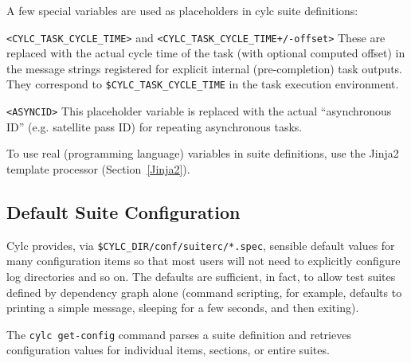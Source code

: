 A few special variables are used as placeholders in cylc suite definitions:

\begin{myitemize}
    \item \lstinline=<CYLC_TASK_CYCLE_TIME>= and
        \lstinline=<CYLC_TASK_CYCLE_TIME+/-offset>= \newline
        These are replaced with the actual cycle time of the task (with
        optional computed offset) in the message strings registered for
        explicit internal (pre-completion) task outputs. They correspond to 
        \lstinline=$CYLC_TASK_CYCLE_TIME= in the task execution environment.

    \item \lstinline=<ASYNCID>=\newline
        This placeholder variable is replaced with the actual ``asynchronous
        ID'' (e.g. satellite pass ID) for repeating asynchronous tasks.
\end{myitemize}

To use real (programming language) variables in suite definitions, use the 
Jinja2 template processor (Section~\ref{Jinja2}).


\subsection{Default Suite Configuration}
\label{SuiteDefaults}

Cylc provides, via \lstinline=$CYLC_DIR/conf/suiterc/*.spec=, sensible
default values for many configuration items so that most users will not
need to explicitly configure log directories and so on. The defaults are
sufficient, in fact, to allow test suites defined by dependency graph
alone (command scripting, for example, defaults to printing a simple
message, sleeping for a few seconds, and then exiting). 

The \lstinline=cylc get-config= command parses a suite definition and
retrieves configuration values for individual items, sections, or entire
suites.


